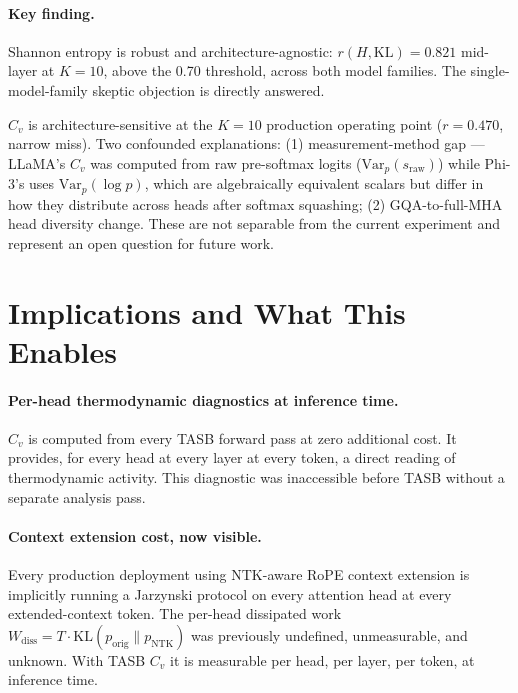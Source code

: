 \documentclass[11pt,a4paper]{article}
\begin{document}
\paragraph{Key finding.} Shannon entropy is robust and architecture-agnostic:
$r(H,\mathrm{KL}) = 0.821$ mid-layer at $K=10$, above the 0.70 threshold, across
both model families. The single-model-family skeptic objection is directly answered.

$C_v$ is architecture-sensitive at the $K=10$ production operating point
($r=0.470$, narrow miss). Two confounded explanations: (1) measurement-method
gap --- LLaMA's $C_v$ was computed from raw pre-softmax logits ($\mathrm{Var}_p(s_\mathrm{raw})$)
while Phi-3's uses $\mathrm{Var}_p(\log p)$, which are algebraically equivalent
scalars but differ in how they distribute across heads after softmax squashing;
(2) GQA-to-full-MHA head diversity change. These are not separable from the
current experiment and represent an open question for future work.

\section{Implications and What This Enables}
\label{sec:implications}

\paragraph{Per-head thermodynamic diagnostics at inference time.}
$C_v$ is computed from every TASB forward pass at zero additional cost. It
provides, for every head at every layer at every token, a direct reading of
thermodynamic activity. This diagnostic was inaccessible before TASB without
a separate analysis pass.

\paragraph{Context extension cost, now visible.}
Every production deployment using NTK-aware RoPE context extension is implicitly
running a Jarzynski protocol on every attention head at every extended-context
token. The per-head dissipated work $W_\mathrm{diss} = T \cdot \mathrm{KL}(p_\mathrm{orig}
\| p_\mathrm{NTK})$ was previously undefined, unmeasurable, and unknown. With
TASB $C_v$ it is measurable per head, per layer, per token, at inference time.
\end{document}
